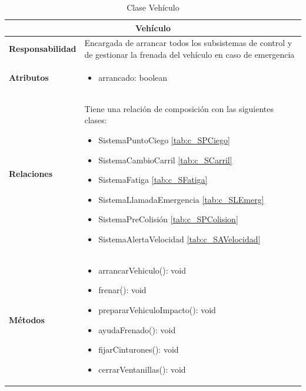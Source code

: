 \begin{table}[H]
\begin{center}
\begin{tabular}{p{} p{11cm}}
\multicolumn{2}{c}{\textbf{Vehículo} } \\ \hline \hline
\textbf{Responsabilidad} &  Encargada de arrancar todos los subsistemas de control y de gestionar la frenada del vehículo en caso de emergencia\\ \hline
\textbf{Atributos} &  \begin{itemize} \item arrancado: boolean \end{itemize}\\ \hline
\textbf{Relaciones} & Tiene una relación de composición con las siguientes clases:
                      \begin{itemize}
                        \item SistemaPuntoCiego \ref{tab:c_SPCiego}
                        \item SistemaCambioCarril \ref{tab:c_SCarril}
                        \item SistemaFatiga \ref{tab:c_SFatiga}
                        \item SistemaLlamadaEmergencia \ref{tab:c_SLEmerg}
                        \item SistemaPreColisión \ref{tab:c_SPColision}
                        \item SistemaAlertaVelocidad \ref{tab:c_SAVelocidad}
                      \end{itemize}\\ \hline
\textbf{Métodos} &  \begin{itemize}
                      \item arrancarVehiculo(): void
                      \item frenar(): void
                      \item prepararVehiculoImpacto(): void
                      \item ayudaFrenado(): void
                      \item fijarCinturones(): void
                      \item cerrarVentanillas(): void
                    \end{itemize}\\ \hline
\end{tabular}
\caption{Clase Vehículo}
\label{tab:c_vehiculo}
\end{center}
\end{table}










